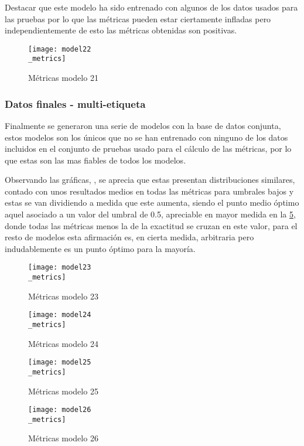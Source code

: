 Destacar que este modelo ha sido entrenado con algunos de los datos usados para
las pruebas por lo que las métricas pueden estar ciertamente infladas pero
independientemente de esto las métricas obtenidas son positivas.
\begin{figure}[H]
    \centering
    \texttt{[image: model22\\\_metrics]}
    \captionsetup{justification=centering}
    \caption{Métricas modelo 21}
    \label{fig:Metricas modelo 21}
\end{figure}

\subsubsection{Datos finales - multi-etiqueta}
Finalmente se generaron una serie de modelos con la base de datos conjunta,
estos modelos son los únicos que no se han entrenado con ninguno de los datos
incluidos en el conjunto de pruebas usado para el cálculo de las métricas, por
lo que estas son las mas fiables de todos los modelos. 

Observando las gráficas, , se
aprecia que estas presentan distribuciones similares, contado con unos resultados
medios en todas las métricas para umbrales bajos y estas se van dividiendo a
medida que este aumenta, siendo el punto medio óptimo aquel asociado a un valor
del umbral de 0.5, apreciable en mayor medida en la \cref{Metricas modelo 26},
donde todas las métricas menos la de la exactitud se cruzan en este valor, para
el resto de modelos esta afirmación es, en cierta medida, arbitraria pero
indudablemente es un punto óptimo para la mayoría.

\begin{figure}[H]
    \centering
    \texttt{[image: model23\\\_metrics]}
    \captionsetup{justification=centering}
    \caption{Métricas modelo 23}
    \label{Metricas modelo 23}
\end{figure}
\begin{figure}[H]
    \centering
    \texttt{[image: model24\\\_metrics]}
    \captionsetup{justification=centering}
    \caption{Métricas modelo 24}
    \label{Metricas modelo 24}
\end{figure}
\begin{figure}[H]
    \centering
    \texttt{[image: model25\\\_metrics]}
    \captionsetup{justification=centering}
    \caption{Métricas modelo 25}
    \label{Metricas modelo 25}
\end{figure}
\begin{figure}[H]
    \centering
    \texttt{[image: model26\\\_metrics]}
    \captionsetup{justification=centering}
    \caption{Métricas modelo 26}
    \label{Metricas modelo 26}
\end{figure}

